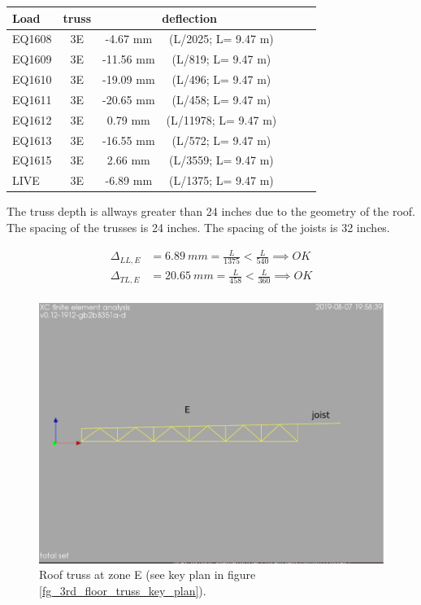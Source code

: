 \begin{center}
  \begin{scriptsize}
  \begin{tabular}{|l|c|c|c|c|c|c|}
    \hline
    \textbf{Load} & \textbf{truss} & \multicolumn{2}{c|}{\textbf{deflection}} \\
    \hline
EQ1608 & 3E & -4.67 mm & (L/2025; L= 9.47 m) \\
EQ1609 & 3E & -11.56 mm & (L/819; L= 9.47 m) \\
EQ1610 & 3E & -19.09 mm & (L/496; L= 9.47 m) \\
EQ1611 & 3E & -20.65 mm & (L/458; L= 9.47 m) \\
EQ1612 & 3E & 0.79 mm & (L/11978; L= 9.47 m) \\
EQ1613 & 3E & -16.55 mm & (L/572; L= 9.47 m) \\
EQ1615 & 3E & 2.66 mm & (L/3559; L= 9.47 m) \\
LIVE & 3E & -6.89 mm & (L/1375; L= 9.47 m) \\
\hline
  \end{tabular}
  \end{scriptsize}
\end{center}

\noindent The truss depth is allways greater than 24 inches due to the geometry of the roof. The spacing of the trusses is 24 inches. The spacing of the joists is 32 inches.

\begin{align}
\Delta_{LL,E} &= 6.89\ mm= \frac{L}{1375} < \frac{L}{540} \implies OK \\
\Delta_{TL,E} &= 20.65\ mm= \frac{L}{458} < \frac{L}{360} \implies OK \\
\end{align}

\begin{figure}
  \begin{center}
  \includegraphics[width=120mm]{figures/trusses/roof_truss_E}
  \end{center}
  \caption{Roof truss at zone E (see key plan in figure \ref{fg_3rd_floor_truss_key_plan}).}\label{fg_roof_truss_E}
\end{figure}

